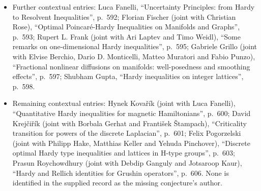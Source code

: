\documentclass[11pt]{article}
\begin{document}
\begin{itemize}
\item Further contextual entries: Luca Fanelli, ``Uncertainty Principles: from Hardy to Resolvent Inequalities'', p.~592; Florian Fischer (joint with Christian Rose), ``Optimal Poincaré-Hardy Inequalities on Manifolds and Graphs'', p.~593; Rupert L. Frank (joint with Ari Laptev and Timo Weidl), ``Some remarks on one-dimensional Hardy inequalities'', p.~595; Gabriele Grillo (joint with Elvise Berchio, Dario D. Monticelli, Matteo Muratori and Fabio Punzo), ``Fractional nonlinear diffusions on manifolds: well-posedness and smoothing effects'', p.~597; Shubham Gupta, ``Hardy inequalities on integer lattices'', p.~598.
\item Remaining contextual entries: Hynek Kovařík (joint with Luca Fanelli), ``Quantitative Hardy inequalities for magnetic Hamiltonians'', p.~600; David Krejčiřík (joint with Borbala Gerhat and František Štampach), ``Criticality transition for powers of the discrete Laplacian'', p.~601; Felix Pogorzelski (joint with Philipp Hake, Matthias Keller and Yehuda Pinchover), ``Discrete optimal Hardy type inequalities and lattices in H-type groups'', p.~603; Prasun Roychowdhury (joint with Debdip Ganguly and Jotsaroop Kaur), ``Hardy and Rellich identities for Grushin operators'', p.~606. None is identified in the supplied record as the missing conjecture's author.
\end{itemize}
\end{document}
